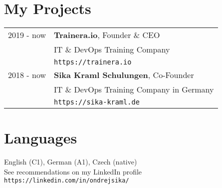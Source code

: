 \documentclass[12pt,a4paper]{article}
\begin{document}
\section*{My Projects}
\begin{tabular}{@{}p{2cm}l}
2019 - now & {\bf Trainera.io}, Founder \& CEO\\
 & IT \& DevOps Training Company\\
 & \texttt{https://trainera.io}\\
2018 - now & {\bf Sika Kraml Schulungen}, Co-Founder\\
 & IT \& DevOps Training Company in Germany\\
 & \texttt{https://sika-kraml.de}\\
\end{tabular}


\section*{Languages}
English (C1), German (A1), Czech (native)\\

See recommendations on my LinkedIn profile \texttt{https://linkedin.com/in/ondrejsika/}\\
\end{document}

